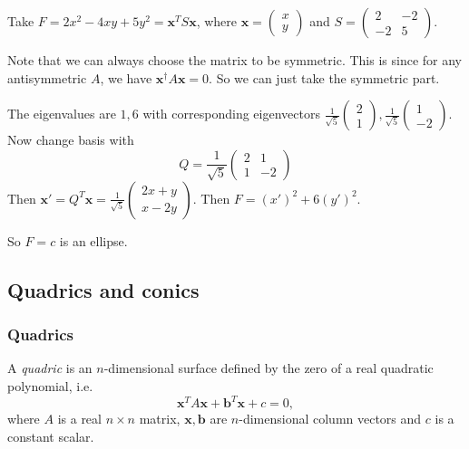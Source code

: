 \documentclass[a4paper]{article}
\begin{document}
\begin{eg}
  Take $F = 2x^2 - 4xy + 5y^2 = \mathbf{x}^TS\mathbf{x}$, where $\mathbf{x} =
  \begin{pmatrix}
    x\\y
  \end{pmatrix}$ and $S =
  \begin{pmatrix}
    2 & -2\\
    -2 & 5
  \end{pmatrix}$.

  Note that we can always choose the matrix to be symmetric. This is since for any antisymmetric $A$, we have $\mathbf{x}^\dagger A\mathbf{x} = 0$. So we can just take the symmetric part.

  The eigenvalues are $1, 6$ with corresponding eigenvectors $
  \displaystyle \frac{1}{\sqrt{5}}\begin{pmatrix}
    2\\1
  \end{pmatrix},\frac{1}{\sqrt{5}}
  \begin{pmatrix}
    1\\-2
  \end{pmatrix}$. Now change basis with
  \[
    Q = \frac{1}{\sqrt{5}}
    \begin{pmatrix}
      2 & 1\\
      1 & -2
    \end{pmatrix}
  \]
  Then $\mathbf{x}' = Q^T\mathbf{x} =
  \frac{1}{\sqrt{5}}\begin{pmatrix}
    2x + y\\x - 2y
  \end{pmatrix}$. Then $F = (x')^2 + 6(y')^2$.

  So $F = c$ is an ellipse.
\end{eg}

\subsection{Quadrics and conics}
\subsubsection{Quadrics}
\begin{defi}[Quadric]
  A \emph{quadric} is an $n$-dimensional surface defined by the zero of a real quadratic polynomial, i.e.
  \[
    \mathbf{x}^T A\mathbf{x} + \mathbf{b}^T\mathbf{x} + c = 0,
  \]
  where $A$ is a real $n\times n$ matrix, $\mathbf{x}, \mathbf{b}$ are $n$-dimensional column vectors and $c$ is a constant scalar.
\end{defi}
\end{document}
